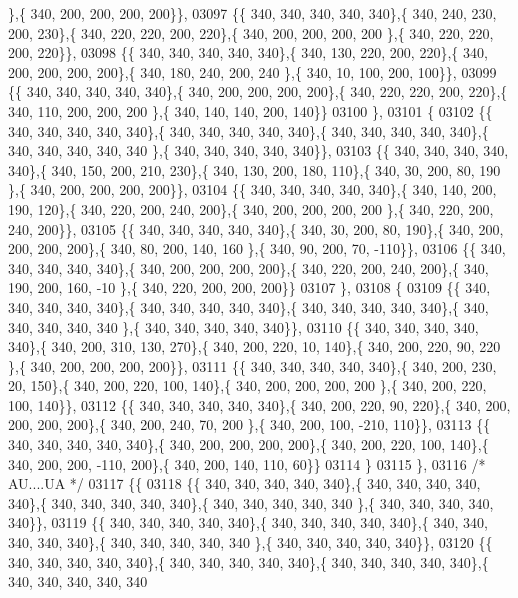 \begin{DoxyCode}
      \},\{ 340, 200, 200, 200, 200\}\},
03097 \{\{ 340, 340, 340, 340, 340\},\{ 340, 240, 230, 200, 230\},\{ 340, 220, 220, 200, 220\},\{ 340, 200, 200, 200, 200
      \},\{ 340, 220, 220, 200, 220\}\},
03098 \{\{ 340, 340, 340, 340, 340\},\{ 340, 130, 220, 200, 220\},\{ 340, 200, 200, 200, 200\},\{ 340, 180, 240, 200, 240
      \},\{ 340,  10, 100, 200, 100\}\},
03099 \{\{ 340, 340, 340, 340, 340\},\{ 340, 200, 200, 200, 200\},\{ 340, 220, 220, 200, 220\},\{ 340, 110, 200, 200, 200
      \},\{ 340, 140, 140, 200, 140\}\}
03100 \},
03101 \{
03102 \{\{ 340, 340, 340, 340, 340\},\{ 340, 340, 340, 340, 340\},\{ 340, 340, 340, 340, 340\},\{ 340, 340, 340, 340, 340
      \},\{ 340, 340, 340, 340, 340\}\},
03103 \{\{ 340, 340, 340, 340, 340\},\{ 340, 150, 200, 210, 230\},\{ 340, 130, 200, 180, 110\},\{ 340,  30, 200,  80, 190
      \},\{ 340, 200, 200, 200, 200\}\},
03104 \{\{ 340, 340, 340, 340, 340\},\{ 340, 140, 200, 190, 120\},\{ 340, 220, 200, 240, 200\},\{ 340, 200, 200, 200, 200
      \},\{ 340, 220, 200, 240, 200\}\},
03105 \{\{ 340, 340, 340, 340, 340\},\{ 340,  30, 200,  80, 190\},\{ 340, 200, 200, 200, 200\},\{ 340,  80, 200, 140, 160
      \},\{ 340,  90, 200,  70, -110\}\},
03106 \{\{ 340, 340, 340, 340, 340\},\{ 340, 200, 200, 200, 200\},\{ 340, 220, 200, 240, 200\},\{ 340, 190, 200, 160, -10
      \},\{ 340, 220, 200, 200, 200\}\}
03107 \},
03108 \{
03109 \{\{ 340, 340, 340, 340, 340\},\{ 340, 340, 340, 340, 340\},\{ 340, 340, 340, 340, 340\},\{ 340, 340, 340, 340, 340
      \},\{ 340, 340, 340, 340, 340\}\},
03110 \{\{ 340, 340, 340, 340, 340\},\{ 340, 200, 310, 130, 270\},\{ 340, 200, 220,  10, 140\},\{ 340, 200, 220,  90, 220
      \},\{ 340, 200, 200, 200, 200\}\},
03111 \{\{ 340, 340, 340, 340, 340\},\{ 340, 200, 230,  20, 150\},\{ 340, 200, 220, 100, 140\},\{ 340, 200, 200, 200, 200
      \},\{ 340, 200, 220, 100, 140\}\},
03112 \{\{ 340, 340, 340, 340, 340\},\{ 340, 200, 220,  90, 220\},\{ 340, 200, 200, 200, 200\},\{ 340, 200, 240,  70, 200
      \},\{ 340, 200, 100, -210, 110\}\},
03113 \{\{ 340, 340, 340, 340, 340\},\{ 340, 200, 200, 200, 200\},\{ 340, 200, 220, 100, 140\},\{ 340, 200, 200, -110, 
      200\},\{ 340, 200, 140, 110,  60\}\}
03114 \}
03115 \},
03116 \textcolor{comment}{/* AU....UA */}
03117 \{\{
03118 \{\{ 340, 340, 340, 340, 340\},\{ 340, 340, 340, 340, 340\},\{ 340, 340, 340, 340, 340\},\{ 340, 340, 340, 340, 340
      \},\{ 340, 340, 340, 340, 340\}\},
03119 \{\{ 340, 340, 340, 340, 340\},\{ 340, 340, 340, 340, 340\},\{ 340, 340, 340, 340, 340\},\{ 340, 340, 340, 340, 340
      \},\{ 340, 340, 340, 340, 340\}\},
03120 \{\{ 340, 340, 340, 340, 340\},\{ 340, 340, 340, 340, 340\},\{ 340, 340, 340, 340, 340\},\{ 340, 340, 340, 340, 340

\end{DoxyCode}
